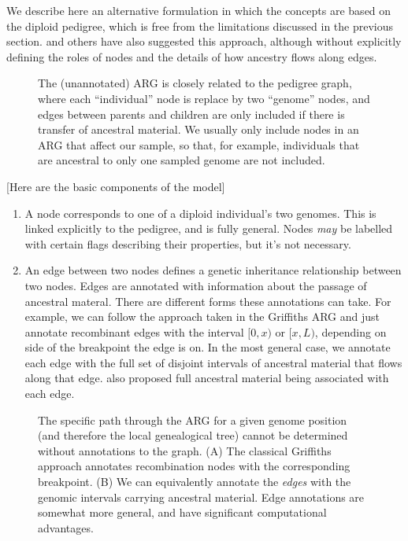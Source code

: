 \documentclass{article}
\begin{document}
We describe here an alternative formulation in which the
concepts are based on the diploid pedigree, which
is free from the limitations discussed in the previous section.
\cite{mathieson2020ancestry} and others
\citep{wakeley2012genetics,gusfield2014recombinatorics,speed2015naturereviewsgenetics}
have also suggested this approach, although without explicitly defining
the roles of nodes and the details of how ancestry
flows along edges.
\begin{figure}
\vspace{5em}
\caption{\label{fig-pedigree-and-arg}
The (unannotated) ARG is closely related to the pedigree
graph, where each ``individual'' node is replace by two ``genome''
nodes, and edges between parents and children are only included if there is
transfer of ancestral material. We usually only include nodes in an ARG
that affect our sample, so that, for example, individuals that are ancestral
to only one sampled genome are not included.}
\end{figure}

[Here are the basic components of the model]

\begin{enumerate}
\item A node corresponds to one of a diploid individual's two genomes.
This is linked explicitly to the pedigree, and is fully general.
Nodes \emph{may} be labelled with certain flags describing their properties,
but it's not necessary.
\item An edge between two nodes defines a genetic inheritance relationship
between two nodes. Edges are annotated with information about the
passage of ancestral materal. There are different forms these annotations
can take. For example, we can follow the approach taken in the Griffiths
ARG and just annotate recombinant edges with the interval $[0, x)$ or $[x, L)$,
depending on side of the breakpoint the edge is on. In the most
general case, we annotate each edge with the full set of disjoint
intervals of ancestral material that flows along that edge.
\citep{mcgill2013graphml} also proposed full ancestral material being
associated with each edge.
\end{enumerate}

\begin{figure}
\vspace{5em}
\caption{\label{fig-arg-annotations}
The specific path through the ARG for a given genome position (and therefore
the local genealogical tree) cannot be determined without annotations
to the graph. (A) The classical Griffiths approach annotates recombination
nodes with the corresponding breakpoint. (B) We can equivalently
annotate the \emph{edges} with the genomic intervals carrying ancestral
material. Edge annotations are somewhat more general, and have
significant computational advantages.}
\end{figure}
\end{document}

